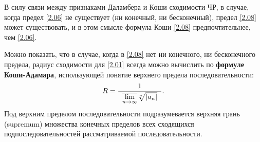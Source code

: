 \begin{notes}
	\item В силу связи между признаками Даламбера и Коши сходимости ЧР, в случае, когда предел \eqref{2.06} не существует (ни конечный, ни бесконечный),
	предел \eqref{2.08} может существовать, и в этом смысле формула Коши \eqref{2.08} предпочтительнее, чем \eqref{2.06}.

	\item Можно показать, что в случае, когда в \eqref{2.08} нет ни конечного, ни бесконечного предела, радиус сходимости для \eqref{2.01} всегда можно вычислить по
	\textbf{формуле Коши-Адамара}, использующей понятие верхнего предела последовательности:
	\begin{equation}
	\label{2.09}
	R = \dfrac{1}{\;\; \overline{\lim\limits_{n\to\infty}} \sqrt[n]{\left\lvert a_n \right\rvert} \;\;}.
	\end{equation}
	Под верхним пределом последовательности подразумевается верхняя грань (supremum) множества конечных пределов всех сходящихся подпоследовательностей рассматриваемой последовательности.
\end{notes}
